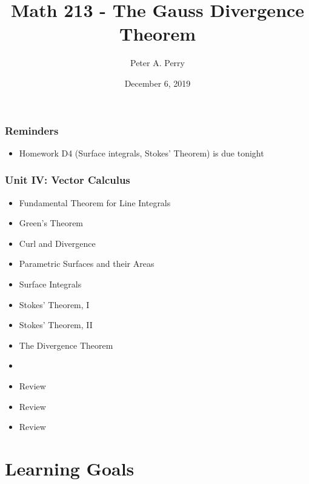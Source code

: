 \documentclass[notes=show,10pt]{beamer}
\begin{document}


\title{Math 213 - The Gauss Divergence Theorem}			%
\author{Peter A. Perry}
\date{December 6, 2019}
\maketitle

%	
%

\begin{frame}
\frametitle{Reminders}

\begin{itemize}


\item	Homework D4 (Surface integrals, Stokes' Theorem) is due tonight

\end{itemize}

\end{frame}

%
%

\begin{frame}
\frametitle{Unit IV: Vector Calculus}
\begin{center}
\begin{itemize}
\item[{}]			Fundamental Theorem for Line Integrals
\item[{}]			Green's Theorem
\item[{}]			Curl and Divergence
\item[{}]			Parametric Surfaces and their Areas
\item[{}]			Surface Integrals
\item[{}]			Stokes' Theorem, I
\item[{}]			Stokes' Theorem, II 
\begingroup
\color{red}
\item[{}]			The Divergence Theorem
\endgroup
\item[{}]			
\item[{}]			Review
\item[{}]			Review
\item[{}]			Review
\end{itemize}
\end{center}
\end{frame}

\section{Learning Goals}
\end{document}
